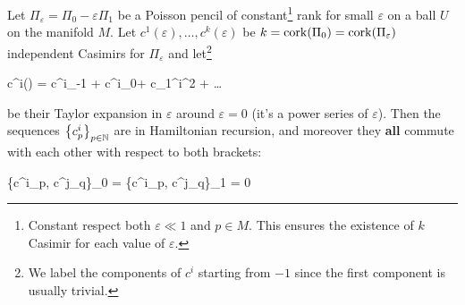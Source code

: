 \documentclass[main.tex]{subfiles}
\begin{document}
\begin{theorem}
	Let $\Pi_\varepsilon = \Pi_0 - \varepsilon \Pi_1$ be a Poisson pencil of constant\footnote{Constant respect both $\varepsilon\ll1$ and $p\in M$. This ensures the existence of $k$ Casimir for each value of $\varepsilon$.} rank for small $\varepsilon$ on a ball $U$ on the manifold $M$. Let $c^1(\varepsilon), \ldots, c^k(\varepsilon)$ be $k = \operatorname{cork}(\Pi_0) = \operatorname{cork}(\Pi_\varepsilon)$ independent Casimirs for $\Pi_\varepsilon$ and let\footnote{We label the components of $c^i$ starting from $-1$ since the first component is usually trivial.}
	\begin{eqalign}
	\label{eq:casimir_taylor_exp}
		c^i(\varepsilon) = c^i_{-1} + c^i_0\varepsilon + c_1^i\varepsilon^2 + \ldots
	\end{eqalign}
	be their Taylor expansion in $\varepsilon$ around $\varepsilon = 0$ (it's a power series of $\varepsilon$). Then the sequences $\left\{c^i_{p}\right\}_{p \in \mathbb{N}}$ are in Hamiltonian recursion, and moreover they \textbf{all} commute with each other with respect to both brackets:
	\begin{eqalign}
		\{c^i_p, c^j_q\}_0 = \{c^i_p, c^j_q\}_1 = 0
	\end{eqalign}
\end{theorem}
\end{document}
